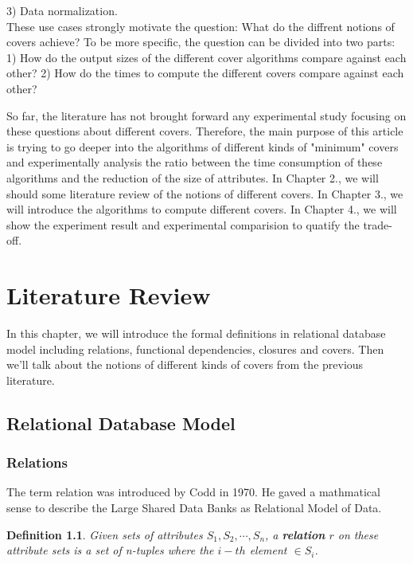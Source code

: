 \documentclass[11pt]{book}
\newtheorem{mydef}[thm]{Definition}
\begin{document}
3) Data normalization.
~\\

These use cases strongly motivate the question: What do the diffrent notions of covers achieve? To be more specific, the question can be divided into two parts: 1) How do the output sizes of the different cover algorithms compare against each other? 2) How do the times to compute the different covers compare against each other?

So far, the literature has not brought forward any experimental study focusing on these questions about different covers. Therefore, the main purpose of this article is trying to go deeper into the algorithms of different kinds of "minimum" covers and experimentally analysis the ratio between the time consumption of these algorithms and the reduction of the size of attributes. In Chapter 2., we will should some literature review of the notions of different covers. In Chapter 3., we will introduce the algorithms to compute different covers. In Chapter 4., we will show the experiment result and experimental comparision to quatify the trade-off.

\chapter{Literature Review}

In this chapter, we will introduce the formal definitions in relational database model including relations, functional dependencies, closures and covers. Then we'll talk about the notions of different kinds of covers from the previous literature.

\section{Relational Database Model}

\subsection{Relations}

The term relation was introduced by Codd \cite{codd13f} in 1970. He gaved a mathmatical sense to describe the Large Shared Data Banks as Relational Model of Data. 

\begin{mydef}
Given sets of attributes $S_1, S_2, \cdots, S_n$, a \textbf{relation} $r$ on these attribute sets is a set of n-tuples where the $i-th$ element $\in S_i$.
\end{mydef}
\end{document}
